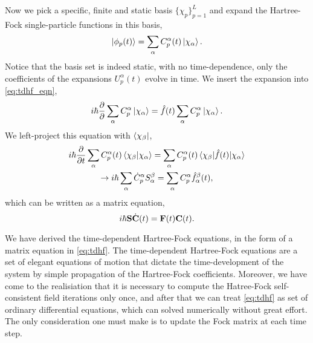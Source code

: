 Now we pick a specific, finite and static basis $\{\chi_p\}_{p=1}^{L}$ and expand the Hartree-Fock single-particle
functions in this basis,
\begin{equation}
    \ket{\phi_p(t)} = \sum_\alpha C^\alpha_p(t) \ket{\chi_\alpha}.
\end{equation}
Notice that the basis set is indeed static, with no time-dependence, only the coefficients 
of the expansions $U^\alpha_p(t)$ evolve in time.  
We insert the expansion into \autoref{eq:tdhf_eqn},
\begin{equation}
    i\hbar\frac{\partial}{\partial}\sum_\alpha C^\alpha_p \ket{\chi_\alpha} = \hat{f}(t)\sum_\alpha C^\alpha_p \ket{\chi_\alpha}.
\end{equation}
We left-project this equation with $\bra{\chi_\beta}$,
\begin{equation}
    \begin{gathered}
    i\hbar\frac{\partial}{\partial t} \sum_\alpha C^\alpha_p(t)\braket{\chi_\beta}{\chi_\alpha}
        = \sum_\alpha C^\alpha_p(t) \mel{\chi_\beta}{\hat{f}(t)}{\chi_\alpha}  \\
    \to i\hbar \sum_\alpha \dot{C}^\alpha_p S^\beta_\alpha = \sum_\alpha C^\alpha_p\hat{f}^\beta_\alpha(t),
    \end{gathered}
\end{equation}
which can be written as a matrix equation,
\begin{equation}
    \label{eq:tdhf}
    i\hbar \vb{S}\dot{\vb{C}}(t) = \vb{F}(t)\vb{C}(t).
\end{equation}

We have derived the time-dependent Hartree-Fock equations, in the form of
a matrix equation in \autoref{eq:tdhf}. The time-dependent Hartree-Fock equations
are a set of elegant equations of motion that dictate
the time-development of 
the system by simple propagation of the Hartree-Fock coefficients. 
Moreover, we have come to the realisiation that it is necessary 
to compute the Hatree-Fock self-consistent field iterations only once,
and after that we can treat \autoref{eq:tdhf} as set of ordinary 
differential equations, which can solved numerically without great 
effort. The only consideration 
one must make is to update the Fock matrix at each time step.